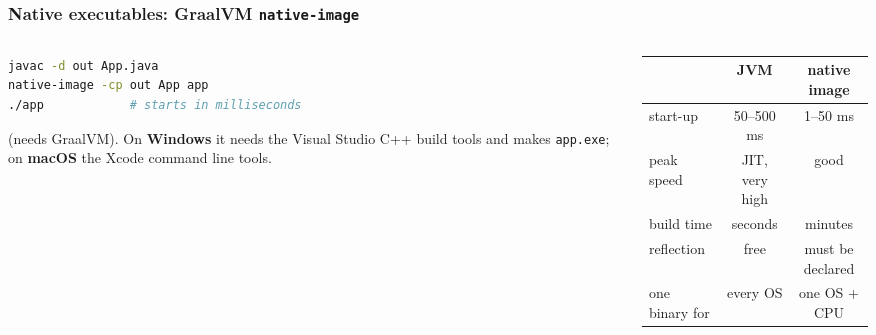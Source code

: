 \documentclass[aspectratio=169,10pt,compress]{beamer}
\newcommand{\win}{\textbf{Windows}}
\newcommand{\mac}{\textbf{macOS}}
\begin{document}
\begin{frame}[t,fragile] \frametitle{Native executables: GraalVM \texttt{native-image}}
  \begin{columns}[T]
    \begin{column}{0.48\textwidth}


\begin{lstlisting}[style=codesnippet, language=bash, basicstyle=\ttfamily\scriptsize]
javac -d out App.java
native-image -cp out App app
./app            # starts in milliseconds
\end{lstlisting}


      \small {} (needs GraalVM). On \win{} it needs the Visual Studio C++ build tools and makes \texttt{app.exe};
      on \mac{} the Xcode command line tools.
    \end{column}
    \begin{column}{0.48\textwidth}
      \begin{center}\scriptsize
      \begin{tabular}{lcc}
        \toprule
                          & JVM               & native image \\
        \midrule
        start-up          & 50--500 ms        & 1--50 ms \\
        peak speed        & JIT, very high    & good \\
        build time        & seconds           & minutes \\
        reflection        & free              & must be declared \\
        one binary for    & every OS          & one OS + CPU \\
        \bottomrule
      \end{tabular}
      \end{center}
    \end{column}
  \end{columns}
\end{frame}

\end{document}
